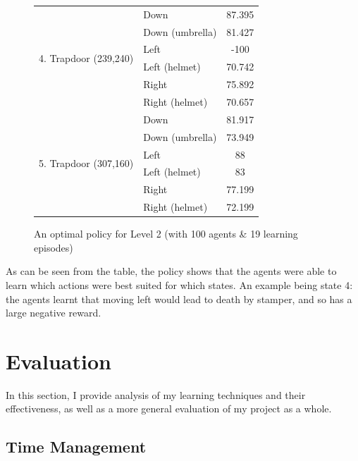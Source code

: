 \documentclass[a4paper,oneside]{report}
\begin{document}
\begin{figure}[H]
\begin{tabular}{|l|l|c|}
\multirow{6}{*}{4. Trapdoor (239,240)} & Down & 87.395 \\
 & Down (umbrella) & 81.427 \\
 & Left & -100 \\
 & Left (helmet) & 70.742 \\
 & Right & 75.892 \\
 & Right (helmet) & 70.657 \\ \hline

\multirow{6}{*}{5. Trapdoor (307,160)} & Down & 81.917 \\
 & Down (umbrella) & 73.949 \\
 & Left & 88 \\
 & Left (helmet) & 83 \\
 & Right & 77.199 \\
 & Right (helmet) & 72.199 \\ \hline
 
\end{tabular}

\caption{An optimal policy for Level 2 (with 100 agents \& 19 learning episodes)}
\end{figure}

As can be seen from the table, the policy shows that the agents were able to learn which actions were best suited for which states. An example being state 4: the agents learnt that moving left would lead to death by stamper, and so has a large negative reward.



%
%

\chapter{Evaluation}

In this section, I provide analysis of my learning techniques and their effectiveness, as well as a more general evaluation of my project as a whole.

\section{Time Management}
\end{document}
